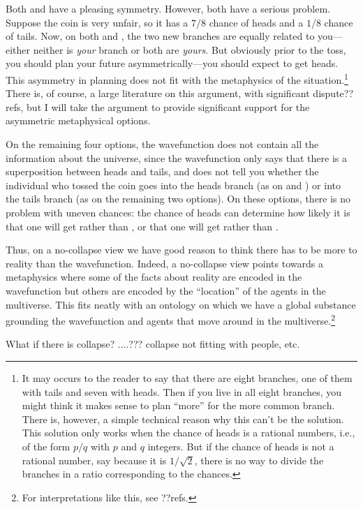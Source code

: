 Both  and  have a pleasing symmetry. However, both have a serious problem.
Suppose the coin is very unfair, so it has a $7/8$ chance of heads and a $1/8$ chance of tails. Now, on both 
 and , the two new branches are equally related to you---either neither is 
\textit{your} branch or both are \textit{yours}. But obviously prior to the toss, you should plan your future 
asymmetrically---you should expect to get heads. This asymmetry in planning does not fit with the metaphysics 
of the situation.\footnote{It may occurs to the reader to say that there are eight branches, one of them with 
tails and seven with heads. Then if you live in all eight branches, you might think it makes sense to plan 
``more'' for the more common branch. There is, however, a simple technical reason why this can't be the solution.
This solution only works when the chance of heads is a rational numbers, i.e., of the form $p/q$ with $p$ and $q$ integers.
But if the chance of heads is not a rational number, say because it is $1/\sqrt{2}$, there is no way to divide 
the branches in a ratio corresponding to the chances.} There is, of course, a large literature on this argument, with significant dispute??refs, but I will take the argument to provide significant support for the asymmetric metaphysical options. 

On the remaining four options, the wavefunction does not contain all the information about the universe, since the wavefunction
only says that there is a superposition between heads and tails, and does not tell you whether the individual who tossed
the coin goes into the heads branch (as on  and ) or into the tails branch (as on
the remaining two options). On these options, there is no problem with uneven chances: the chance of heads can determine 
how likely it is that one will get  rather than , or that one will get 
 rather than .

Thus, on a no-collapse view we have good reason to think there has to be more to reality 
than the wavefunction. Indeed, a no-collapse view points towards a metaphysics where some of the facts about 
reality are encoded in the wavefunction but others are encoded by the ``location'' of the agents in the multiverse.
This fits neatly with an ontology on which we have a global substance grounding the wavefunction and agents that 
move around in the multiverse.\footnote{For interpretations like this, see ??refs.}

What if there is collapse? ....??? collapse not fitting with people, etc.

\chaptertail
